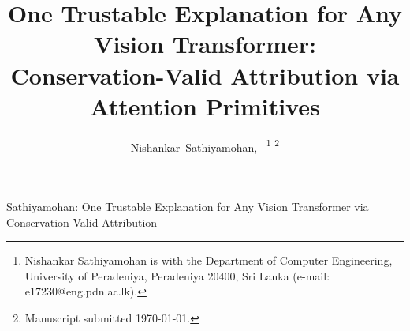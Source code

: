 \documentclass[lettersize,journal]{IEEEtran}
\begin{document}

\title{One Trustable Explanation for Any Vision Transformer:\\ Conservation-Valid Attribution via Attention Primitives}

\author{Nishankar~Sathiyamohan,~%
  \thanks{Nishankar Sathiyamohan is with the Department of Computer
  Engineering, University of Peradeniya, Peradeniya 20400, Sri Lanka
  (e-mail: e17230@eng.pdn.ac.lk).}%
  \thanks{Manuscript submitted \today.}}

%
         {Sathiyamohan: One Trustable Explanation for Any Vision Transformer via Conservation-Valid Attribution}

\maketitle
\end{document}
